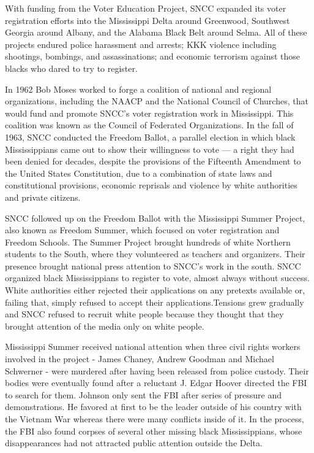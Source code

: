 With funding from the Voter Education Project, SNCC expanded its voter
registration efforts into the Mississippi Delta around Greenwood,
Southwest Georgia around Albany, and the Alabama Black Belt around
Selma. All of these projects endured police harassment and arrests; KKK
violence including shootings, bombings, and assassinations; and economic
terrorism against those blacks who dared to try to register.

In 1962 Bob Moses worked to forge a coalition of national and regional
organizations, including the NAACP and the National Council of Churches,
that would fund and promote SNCC's voter registration work in
Mississippi. This coalition was known as the Council of Federated
Organizations. In the fall of 1963, SNCC conducted the Freedom Ballot, a
parallel election in which black Mississippians came out to show their
willingness to vote --- a right they had been denied for decades,
despite the provisions of the Fifteenth Amendment to the United States
Constitution, due to a combination of state laws and constitutional
provisions, economic reprisals and violence by white authorities and
private citizens.

SNCC followed up on the Freedom Ballot with the Mississippi Summer
Project, also known as Freedom Summer, which focused on voter
registration and Freedom Schools. The Summer Project brought hundreds of
white Northern students to the South, where they volunteered as teachers
and organizers. Their presence brought national press attention to
SNCC's work in the south. SNCC organized black Mississippians to
register to vote, almost always without success. White authorities
either rejected their applications on any pretexts available or, failing
that, simply refused to accept their applications.Tensions grew
gradually and SNCC refused to recruit white people because they thought
that they brought attention of the media only on white people.

Mississippi Summer received national attention when three civil rights
workers involved in the project - James Chaney, Andrew Goodman and
Michael Schwerner - were murdered after having been released from police
custody. Their bodies were eventually found after a reluctant J. Edgar
Hoover directed the FBI to search for them. Johnson only sent the FBI
after series of pressure and demonstrations. He favored at first to be
the leader outside of his country with the Vietnam War whereas there
were many conflicts inside of it. In the process, the FBI also found
corpses of several other missing black Mississippians, whose
disappearances had not attracted public attention outside the Delta.

